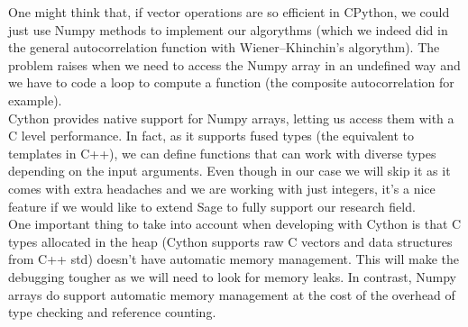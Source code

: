 One might think that, if vector operations are so efficient in CPython, we could
just use Numpy methods to implement our algorythms (which we indeed did in
the general autocorrelation function with Wiener–Khinchin's algorythm). The
problem raises when we need to access the Numpy array in an undefined way and
we have to code a loop to compute a function (the composite autocorrelation
for example).\\

Cython provides native support for Numpy arrays, letting us access them with a
C level performance. In fact, as it supports fused types (the equivalent to
templates in C++), we can define functions that can work with diverse types
depending on the input arguments. Even though in our case we will skip it
as it comes with extra headaches and we are working with just integers,
it's a nice feature if we would like to extend Sage to fully support our
research field.\\

One important thing to take into account when developing with Cython is that
C types allocated in the heap (Cython supports raw C vectors and data structures
from C++ std) doesn't have automatic memory management. This will make the
debugging tougher as we will need to look for memory leaks. In contrast,
Numpy arrays do support automatic memory management at the cost of the overhead
of type checking and reference counting.\\
